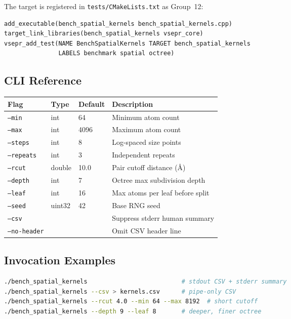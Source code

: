 \documentclass[11pt,a4paper]{article}
\theoremstyle{definition}
\theoremstyle{plain}
\begin{document}
The target is registered in \texttt{tests/CMakeLists.txt} as Group~12:
\begin{lstlisting}[language={},basicstyle=\ttfamily\small]
add_executable(bench_spatial_kernels bench_spatial_kernels.cpp)
target_link_libraries(bench_spatial_kernels vsepr_core)
vsepr_add_test(NAME BenchSpatialKernels TARGET bench_spatial_kernels
			   LABELS benchmark spatial octree)
\end{lstlisting}

\subsection{CLI Reference}

\begin{center}
\begin{tabular}{llll}
\toprule
Flag & Type & Default & Description \\
\midrule
\texttt{--min}       & int    & 64    & Minimum atom count \\
\texttt{--max}       & int    & 4096  & Maximum atom count \\
\texttt{--steps}     & int    & 8     & Log-spaced size points \\
\texttt{--repeats}   & int    & 3     & Independent repeats \\
\texttt{--rcut}      & double & 10.0  & Pair cutoff distance (\AA) \\
\texttt{--depth}     & int    & 7     & Octree max subdivision depth \\
\texttt{--leaf}      & int    & 16    & Max atoms per leaf before split \\
\texttt{--seed}      & uint32 & 42    & Base RNG seed \\
\texttt{--csv}       &        &       & Suppress stderr human summary \\
\texttt{--no-header} &        &       & Omit CSV header line \\
\bottomrule
\end{tabular}
\end{center}

\subsection{Invocation Examples}

\begin{lstlisting}[language=bash,basicstyle=\ttfamily\small]
./bench_spatial_kernels                          # stdout CSV + stderr summary
./bench_spatial_kernels --csv > kernels.csv      # pipe-only CSV
./bench_spatial_kernels --rcut 4.0 --min 64 --max 8192  # short cutoff
./bench_spatial_kernels --depth 9 --leaf 8       # deeper, finer octree
\end{lstlisting}
\end{document}
